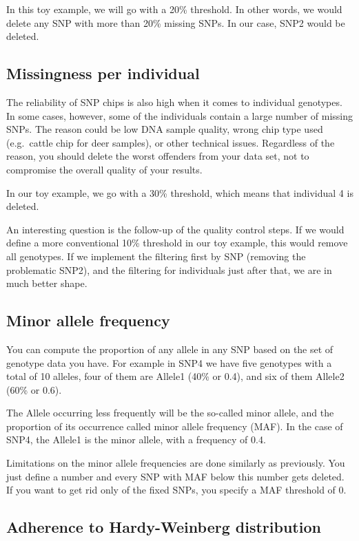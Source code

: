 \documentclass[]{book}
\begin{document}
In this toy example, we will go with a 20\% threshold. In other words,
we would delete any SNP with more than 20\% missing SNPs. In our case,
SNP2 would be deleted.

\subsection{Missingness per
individual}\label{missingness-per-individual}

The reliability of SNP chips is also high when it comes to individual
genotypes. In some cases, however, some of the individuals contain a
large number of missing SNPs. The reason could be low DNA sample
quality, wrong chip type used (e.g.~cattle chip for deer samples), or
other technical issues. Regardless of the reason, you should delete the
worst offenders from your data set, not to compromise the overall
quality of your results.

In our toy example, we go with a 30\% threshold, which means that
individual 4 is deleted.

An interesting question is the follow-up of the quality control steps.
If we would define a more conventional 10\% threshold in our toy
example, this would remove all genotypes. If we implement the filtering
first by SNP (removing the problematic SNP2), and the filtering for
individuals just after that, we are in much better shape.

\subsection{Minor allele frequency}\label{minor-allele-frequency}

You can compute the proportion of any allele in any SNP based on the set
of genotype data you have. For example in SNP4 we have five genotypes
with a total of 10 alleles, four of them are Allele1 (40\% or 0.4), and
six of them Allele2 (60\% or 0.6).

The Allele occurring less frequently will be the so-called minor allele,
and the proportion of its occurrence called minor allele frequency
(MAF). In the case of SNP4, the Allele1 is the minor allele, with a
frequency of 0.4.

Limitations on the minor allele frequencies are done similarly as
previously. You just define a number and every SNP with MAF below this
number gets deleted. If you want to get rid only of the fixed SNPs, you
specify a MAF threshold of 0.

\subsection{Adherence to Hardy-Weinberg
distribution}\label{adherence-to-hardy-weinberg-distribution}
\end{document}
